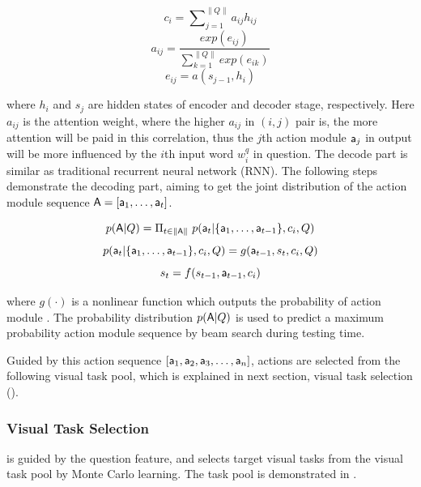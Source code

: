 \begin{small}
\begin{equation} 
    c_i= \sum\nolimits_{j=1}^{\|Q\|} a_{ij}h_{ij}
\end{equation}
\begin{equation} 
    a_{ij}= \frac{exp(e_{ij})}{\sum\nolimits_{k=1}^{\|Q\|} exp(e_{ik})}
\end{equation}
\begin{equation} 
    e_{ij}= a(s_{j-1},h_i)
\end{equation}
\end{small}

\noindent where $h_i$ and $s_j$ are hidden states of encoder and decoder stage, respectively. Here $a_{ij}$ is the attention weight, where the higher $a_{ij}$ in $(i,j)$ pair is, the more attention will be paid in this correlation, thus the $j$th action module ${\mathsf{a}}_j$ in output will be more influenced by the $i$th input word $w_i^q$ in question. The decode part is similar as traditional recurrent neural network (RNN). The following steps demonstrate the decoding part, aiming to get the joint distribution of the action module sequence ${\mathsf{A}} = [{\mathsf{a}}_1,\dots,{\mathsf{a}}_t]$.

\begin{small}
\begin{equation} 
    p({\mathsf{A}}|Q) = \Pi_{t\in\|{\mathsf{A}}\|}~p({\mathsf{a}}_t|\{{\mathsf{a}}_1,\dots,{\mathsf{a}}_{t-1}\},c_i,Q)
\end{equation}
\begin{equation} 
    p({\mathsf{a}}_t|\{{\mathsf{a}}_1,\dots,{\mathsf{a}}_{t-1}\},c_i,Q)= g({\mathsf{a}}_{t-1},s_t,c_i,Q)
\end{equation}
\begin{equation} 
    s_t = f(s_{t-1},{\mathsf{a}}_{t-1},c_i)
\end{equation}
\end{small}
\noindent where $g(\cdot)$ is a nonlinear function which outputs the probability of action module . The probability distribution $p({\mathsf{A}}|Q)$ is used to predict a maximum probability action module sequence by beam search during testing time.

Guided by this action sequence $[{\mathsf{a}}_1,{\mathsf{a}}_2,{\mathsf{a}}_3,\dots,{\mathsf{a}}_n]$, actions are selected from the following visual task pool, which is explained in next section, visual task selection ().


\subsubsection{Visual Task Selection}
\label{sec-VTS}
\hspace{\parindent} is guided by the question feature, and selects target visual tasks from the visual task pool by Monte Carlo learning. The task pool is demonstrated in .


